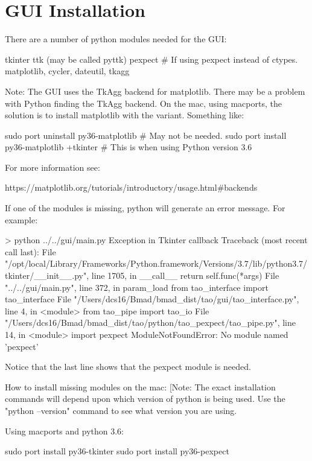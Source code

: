 \chapter{GUI Installation}
\label{s:gui.install}

There are a number of python modules needed for the GUI:
\begin{example}
  tkinter
  ttk (may be called pyttk)
  pexpect         # If using pexpect instead of ctypes.
  matplotlib, cycler, dateutil, tkagg
\end{example}
Note: The GUI uses the TkAgg backend for matplotlib. There may be a problem with Python finding the
TkAgg backend. On the mac, using macports, the solution is to install matplotlib with the
 variant. Something like:
\begin{example}
  sudo port uninstall py36-matplotlib           # May not be needed.
  sudo port install  py36-matplotlib +tkinter   # This is when using Python version 3.6
\end{example}
For more information see:
\begin{example}
  https://matplotlib.org/tutorials/introductory/usage.html#backends
\end{example}

If one of the modules is missing, python will generate an error message. For example:
\begin{example}
> python ../../gui/main.py
Exception in Tkinter callback
Traceback (most recent call last):
  File "/opt/local/Library/Frameworks/Python.framework/Versions/3.7/lib/python3.7/tkinter/__init__.py", line 1705, in __call__
    return self.func(*args)
  File "../../gui/main.py", line 372, in param_load
    from tao_interface import tao_interface
  File "/Users/dcs16/Bmad/bmad_dist/tao/gui/tao_interface.py", line 4, in <module>
    from tao_pipe import tao_io
  File "/Users/dcs16/Bmad/bmad_dist/tao/python/tao_pexpect/tao_pipe.py", line 14, in <module>
    import pexpect
ModuleNotFoundError: No module named 'pexpect'
\end{example}
Notice that the last line shows that the pexpect module is needed.

How to install missing modules on the mac: [Note: The exact installation commands will depend upon
which version of python is being used. Use the "python --version" command to see what version you
are using.

Using macports and python 3.6:
\begin{example}
  sudo port install py36-tkinter
  sudo port install py36-pexpect
\end{example}

